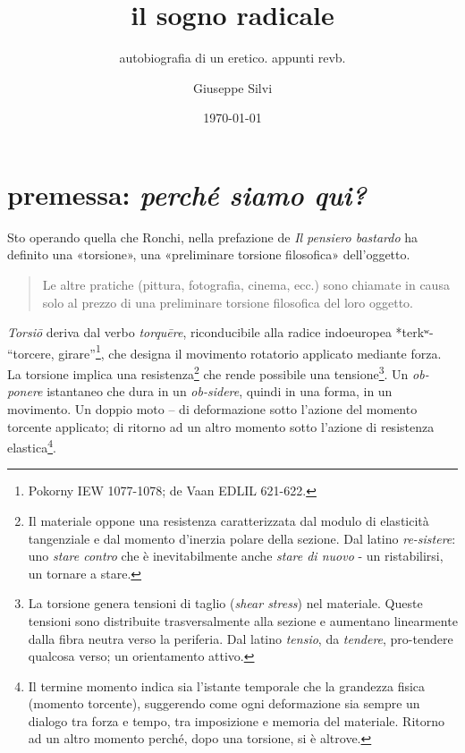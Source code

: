 \documentclass{../../lib/gs}
\title{il sogno radicale}
\subtitle{autobiografia di un eretico. appunti revb.}
\author{Giuseppe Silvi}
\date{\today}
\begin{document}
\maketitle

\section*{premessa: \emph{perché siamo qui?}}

Sto operando quella che Ronchi, nella prefazione de \emph{Il pensiero bastardo}
\cite{ronchi2001} ha definito una «torsione», una «preliminare torsione
filosofica» dell'oggetto.

\begin{quote}
\begin{sf}
\small
  Le altre pratiche (pittura, fotografia, cinema, ecc.) sono chiamate in causa
  solo al prezzo di una preliminare torsione filosofica del loro oggetto.
  \cite{ronchi2001}
  \end{sf}
\end{quote}

\textit{Torsiō} deriva dal verbo \textit{torquēre}, riconducibile alla radice
indoeuropea *terkʷ- “torcere, girare”\footnote{Pokorny IEW 1077-1078; de Vaan
EDLIL 621-622.}, che designa il movimento rotatorio applicato mediante forza.
La torsione implica una resistenza\footnote{Il materiale oppone una resistenza
caratterizzata dal modulo di elasticità tangenziale e dal momento d'inerzia
polare della sezione. Dal latino \emph{re-sistere}: uno \emph{stare contro} che
è inevitabilmente anche \emph{stare di nuovo} - un ristabilirsi, un tornare a
stare.} che rende possibile una tensione\footnote{La torsione genera tensioni di
taglio (\emph{shear stress}) nel materiale. Queste tensioni sono distribuite
trasversalmente alla sezione e aumentano linearmente dalla fibra neutra verso
la periferia. Dal latino \emph{tensio}, da \emph{tendere}, pro-tendere qualcosa
verso; un orientamento attivo.}. Un \emph{ob-ponere} istantaneo che dura in un
\emph{ob-sidere}, quindi in una forma, in un movimento. Un doppio moto – di
deformazione sotto l'azione del momento torcente applicato; di ritorno ad un
altro momento sotto l'azione di resistenza elastica\footnote{Il termine momento
indica sia l'istante temporale che la grandezza fisica (momento torcente),
suggerendo come ogni deformazione sia sempre un dialogo tra forza e tempo, tra
imposizione e memoria del materiale. Ritorno ad un altro momento perché, dopo
una torsione, si è altrove.}.
\end{document}
